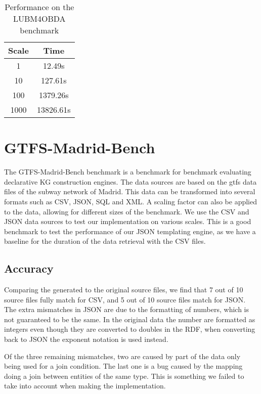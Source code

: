 \begin{table}[h]
    \centering
    \begin{tabular}{|c|c|}
        \hline
        \textbf{Scale} & \textbf{Time} \\
        \hline
        1              & 12.49s        \\ 
        10             & 127.61s       \\
        100            & 1379.26s      \\
        1000           & 13826.61s     \\
        \hline
    \end{tabular}
    \caption{\centering Performance on the LUBM4OBDA benchmark}
    \label{table:lubm4obda_performance}
\end{table}

\section{GTFS-Madrid-Bench}
\label{section:gtfs-madrid-bench}
The GTFS-Madrid-Bench \citep{gtfs-bench} benchmark is a benchmark for benchmark evaluating declarative KG construction engines. The data sources are based on the \acrfull{gtfs} data files of the subway network of Madrid. This data can be transformed into several formats such as CSV, JSON, SQL and XML. A scaling factor can also be applied to the data, allowing for different sizes of the benchmark. We use the CSV and JSON data sources to test our implementation on various scales. This is a good benchmark to test the performance of our JSON templating engine, as we have a baseline for the duration of the data retrieval with the CSV files.

\subsection{Accuracy}
Comparing the generated to the original source files, we find that 7 out of 10 source files fully match for CSV, and 5 out of 10 source files match for JSON. The extra mismatches in JSON are due to the formatting of numbers, which is not guaranteed to be the same. In the original data the number are formatted as integers even though they are converted to doubles in the RDF, when converting back to JSON the exponent notation is used instead.

Of the three remaining mismatches, two are caused by part of the data only being used for a join condition. The last one is a bug caused by the mapping doing a join between entities of the same type. This is something we failed to take into account when making the implementation.

